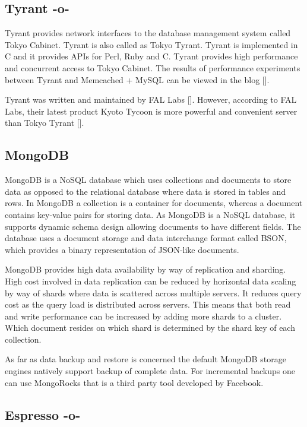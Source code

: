      
\subsection{Tyrant -o-}

Tyrant provides network interfaces to the database management system
called Tokyo Cabinet. Tyrant is also called as Tokyo Tyrant. Tyrant is
implemented in C and it provides APIs for Perl, Ruby and C. Tyrant
provides high performance and concurrent access to Tokyo Cabinet. The
results of performance experiments between Tyrant and Memcached +
MySQL can be viewed in the blog [\cite{www-tyrant-blog}].

Tyrant was written and maintained by FAL
Labs [\cite{www-tyrant-fal-labs}].  However, according to FAL Labs,
their latest product Kyoto Tycoon is more powerful and convenient
server than Tokyo Tyrant [\cite{www-kyoto-tycoon}].




\subsection{MongoDB}

MongoDB is a NoSQL database which uses collections and documents to
store data as opposed to the relational database where data is stored
in tables and rows. In MongoDB a collection is a container for
documents, whereas a document contains key-value pairs for storing
data. As MongoDB is a NoSQL database, it supports dynamic schema
design allowing documents to have different fields. The database uses
a document storage and data interchange format called BSON, which
provides a binary representation of JSON-like documents.

MongoDB provides high data availability by way of replication and
sharding. High cost involved in data replication can be reduced by
horizontal data scaling by way of shards where data is scattered
across multiple servers. It reduces query cost as the query load is
distributed across servers. This means that both read and write
performance can be increased by adding more shards to a cluster. Which
document resides on which shard is determined by the shard key of each
collection.

As far as data backup and restore is concerned the default MongoDB
storage engines natively support backup of complete data. For
incremental backups one can use MongoRocks that is a third party tool
developed by Facebook.

\subsection{Espresso -o-}

